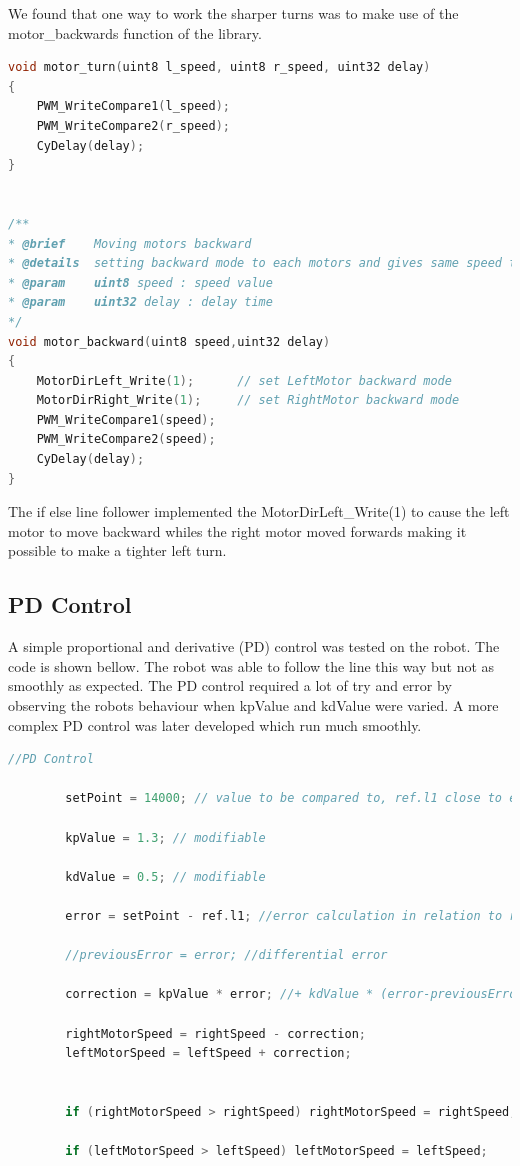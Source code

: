 \documentclass[11pt,a4paper,oneside,article]{memoir}
\begin{document}
We found that one way to work the sharper turns was to make use of the motor\_backwards function of the library.  
\vspace{-22pt}\begin{lstlisting}[language=C,caption={motor\_turn and motor\_backwards},label=Backward]
void motor_turn(uint8 l_speed, uint8 r_speed, uint32 delay)
{
    PWM_WriteCompare1(l_speed); 
    PWM_WriteCompare2(r_speed); 
    CyDelay(delay);
}


/**
* @brief    Moving motors backward
* @details  setting backward mode to each motors and gives same speed to each side of PWM
* @param    uint8 speed : speed value
* @param    uint32 delay : delay time
*/
void motor_backward(uint8 speed,uint32 delay)
{
    MotorDirLeft_Write(1);      // set LeftMotor backward mode
    MotorDirRight_Write(1);     // set RightMotor backward mode
    PWM_WriteCompare1(speed); 
    PWM_WriteCompare2(speed); 
    CyDelay(delay);
}
\end{lstlisting}\vspace{-22pt}
The if else line follower implemented the MotorDirLeft\_Write(1) to cause the left motor to move backward whiles the right motor moved forwards making it possible to make a tighter left turn. 

\subsection{PD Control}
A simple proportional and derivative (PD) control was tested on the robot. The code is shown bellow. The robot was able to follow the line this way but not as smoothly as expected. The PD control required a lot of try and error by observing the robots behaviour when kpValue and kdValue were varied. A more complex PD control was later developed which run much smoothly.
\vspace{-22pt}\begin{lstlisting}[language=C,caption={Simple PD Control},label=Controller]
//PD Control
    
        setPoint = 14000; // value to be compared to, ref.l1 close to edge of line
        
        kpValue = 1.3; // modifiable
        
        kdValue = 0.5; // modifiable
    
        error = setPoint - ref.l1; //error calculation in relation to ref.l1
    
        //previousError = error; //differential error
        
        correction = kpValue * error; //+ kdValue * (error-previousError); //correction to be used
    
        rightMotorSpeed = rightSpeed - correction;
        leftMotorSpeed = leftSpeed + correction;
        
      
        if (rightMotorSpeed > rightSpeed) rightMotorSpeed = rightSpeed;
            
        if (leftMotorSpeed > leftSpeed) leftMotorSpeed = leftSpeed;
\end{lstlisting}\vspace{-22pt}
\end{document}
